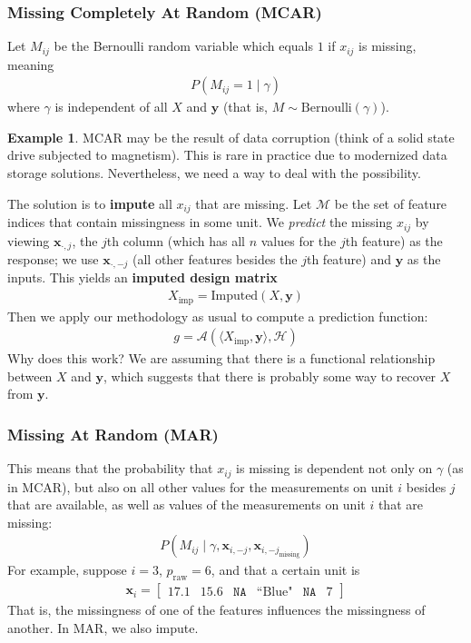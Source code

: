 \documentclass[12pt, a4paper]{article}
\theoremstyle{definition}
\newtheorem*{example}{Example}
\begin{document}
	\subsubsection{Missing Completely At Random (MCAR)}
	Let $M_{ij}$ be the Bernoulli random variable which equals $1$ if $x_{ij}$
	is missing, meaning
	\begin{align*}
		P(M_{ij} = 1 \mid \gamma)
	\end{align*}
	where $\gamma$ is independent of all $X$ and $\bm{y}$ (that is,
	$M \sim \text{Bernoulli}(\gamma)$).
	
	\begin{tcolorbox}[breakable]
		\begin{example}
			MCAR may be the result of data corruption (think of a solid
			state drive subjected to magnetism). This is rare in practice due to
			modernized data storage solutions. Nevertheless, we need a way to deal with
			the possibility.
		\end{example}
	\end{tcolorbox}
	
	The solution is to \textbf{impute} all $x_{ij}$ that are missing. Let
	$\mathcal{M}$ be the set of feature indices that contain missingness
	in some unit. We \textit{predict} the missing $x_{ij}$ by viewing
	$\bm{x}_{\cdot, j}$, the $j$th column (which has all $n$ values for the $j$th feature)
	as the response; we use $\bm{x}_{\cdot, -j}$ (all other features besides the
	$j$th feature) and $\bm{y}$ as the inputs. This yields an \textbf{imputed design matrix}
	\begin{align*}
		X_{\text{imp}} = \text{Imputed}(X, \bm{y})
	\end{align*}
	Then we apply our methodology as usual to compute a prediction function:
	\begin{align*}
		g = \mathcal{A}(\langle X_{\text{imp}}, \bm{y} \rangle, \mathcal{H})
	\end{align*}
	Why does this work? We are assuming that there is a functional relationship
	between $X$ and $\bm{y}$, which suggests that there is probably some
	way to recover $X$ from $\bm{y}$.
	\subsubsection{Missing At Random (MAR)}
	This means that the probability that $x_{ij}$ is missing is dependent
	not only on $\gamma$ (as in MCAR), but also on all other values for
	the measurements on unit $i$ besides $j$ that are available, as well as values
	of the measurements on unit $i$ that are missing:
	\begin{align*}
		P\left(M_{ij} \mid \gamma, \bm{x}_{i, -j}, \bm{x}_{i, -j_{\text{missing}}}\right)
	\end{align*}
	For example, suppose $i = 3$, $p_{\text{raw}} = 6$, and that a certain unit is
	\begin{align*}
		\bm{x}_i = \begin{bmatrix}
			17.1 & 15.6 & \texttt{NA} & \text{``Blue"} & \texttt{NA} & 7
		\end{bmatrix}
	\end{align*}
	That is, the missingness of one of the features influences the missingness
	of another. In MAR, we also impute.
	
\end{document}
